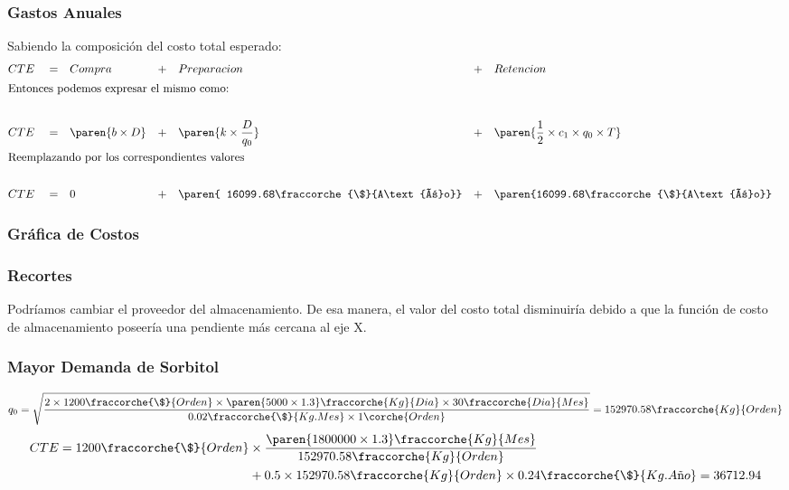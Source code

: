 \begin{homeworkProblem}
\subsubsection{Gastos Anuales}
Sabiendo la composición del costo total esperado:
\begin{align*}
    &CTE& &=& &Compra& &+& &Preparacion& &+& &Retencion& \\
    \intertext{Entonces podemos expresar el mismo como:} \\
    &CTE& &=& &\paren{b\times D}& &+& &\paren{k\times \frac{D}{q_0}}& &+& &\paren{\frac{1}{2}\times c_1 \times q_0 \times T}& \\
    \intertext{Reemplazando por los correspondientes valores} \\
    &CTE& &=& &0&
     &+&
      &\paren{ 16099.68\fraccorche{\$}{A\text{ñ}o}}&  &+& 
      &\paren{16099.68\fraccorche{\$}{A\text{ñ}o}}&  \\
\end{align*}


\subsubsection{Gráfica de Costos}

\subsubsection{Recortes}
Podríamos cambiar el proveedor del almacenamiento. De esa manera, el valor del costo total disminuiría debido a que la función de costo de almacenamiento poseería una pendiente más cercana al eje X.

\subsubsection{Mayor Demanda de Sorbitol}
\begin{align*}
    q_0=\sqrt{
        \frac{
            2\times 1200\fraccorche{\$}{Orden}\times \paren{5000\times 1.3}\fraccorche{Kg}{Dia} \times 30\fraccorche{Dia}{Mes}
            }{
                0.02\fraccorche{\$}{Kg.Mes}\times 1\corche{Orden}
            }
        }
        =
        152970.58\fraccorche{Kg}{Orden}
\end{align*}
\begin{align*}
    CTE = 1200\fraccorche{\$}{Orden}&\times \frac{\paren{1800000\times 1.3}\fraccorche{Kg}{Mes}}{152970.58\fraccorche{Kg}{Orden}} \\ &+ 0.5\times 152970.58\fraccorche{Kg}{Orden}\times 0.24\fraccorche{\$}{Kg.A\text{ñ}o}=36712.94
\end{align*}


\end{homeworkProblem}
